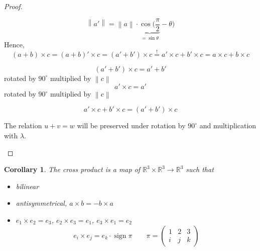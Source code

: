 \documentclass{article}
\newtheorem*{corollary}{Corollary}%
\newcommand{\norm}[1]{\left\|#1\right\|}
\DeclareMathOperator{\sign}{sign}
\begin{document}
\begin{proof}
\begin{itemize}
\begin{enumerate}
          \[ \norm{a'} = \norm{a} \cdot \underbrace{\cos(\frac\pi2}_{=\sin\theta} - \theta) \]
          Hence,
          \[ (a + b) \times c = (a + b)' \times c = (a' + b') \times c \stackrel!= a' \times c + b' \times c = a \times c + b \times c \]

          \[ (a' + b') \times c = a' + b' \]
          rotated by $90^\circ$ multiplied by $\norm{c}$
          \[ a' \times c = a' \]
          rotated by $90^\circ$ multiplied by $\norm{c}$

          \[ a' \times c + b' \times c = (a' + b') \times c \]

          The relation $u + v = w$ will be preserved under rotation by $90^\circ$ and multiplication with $\lambda$.
      \end{enumerate}
  \end{itemize}
\end{proof}

\begin{corollary} %
  The cross product is a map of $\mathbb R^3 \times \mathbb R^3 \to \mathbb R^3$
  such that
  \begin{itemize}
    \item bilinear
    \item antisymmetrical, $a \times b = -b \times a$
    \item $e_1 \times e_2 = e_3$, $e_2 \times e_3 = e_1$, $e_3 \times e_1 = e_2$
      \[ e_i \times e_j = e_k \cdot \sign{\pi} \qquad \pi = \begin{pmatrix} 1 & 2 & 3 \\ i & j & k \end{pmatrix} \]
  \end{itemize}
\end{corollary}
\end{document}
